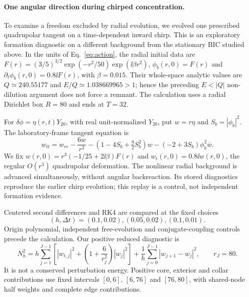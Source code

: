 \paragraph{One angular direction during chirped concentration.}
To examine a freedom excluded by radial evolution, we evolved one prescribed
quadrupolar tangent on a time-dependent inward chirp. This is an exploratory
formation diagnostic on a different background from the stationary BIC
studied above. In the units of Eq.~\eqref{eq:action}, the radial initial data are
$F(r)=(3/5)^{3/2}\exp(-r^2/50)\exp(\ii\beta r^2)$,
$\phi_b(r,0)=F(r)$ and $\partial_t\phi_b(r,0)=0.8\ii F(r)$,
with $\beta=0.015$. Their whole-space analytic values are
$Q\simeq240.55177$ and $E/Q\simeq1.038669965>1$; hence the preceding
$E<|Q|$ non-dilution argument does not force a remnant. The calculation
uses a radial Dirichlet box $R=80$ and ends at $T=32$.

For $\delta\phi=\eta(r,t)Y_{20}$, with real unit-normalized $Y_{20}$,
put $w=r\eta$ and $S_b=|\phi_b|^2$. The laboratory-frame tangent equation is
\begin{equation}
 w_{tt}=w_{rr}-\frac{6w}{r^2}
 -(1-4S_b+\tfrac92 S_b^2)w
 -(-2+3S_b)\phi_b^2\overline w .
 \label{eq:angular-chirp-tangent}
\end{equation}
We fix $w(r,0)=r^3(-1/25+2\ii\beta)F(r)$ and
$w_t(r,0)=0.8\ii w(r,0)$, the regular $O(r^3)$ quadrupolar deformation.
The nonlinear radial background is advanced simultaneously, without angular
backreaction. Its stored diagnostics reproduce the earlier chirp evolution;
this replay is a control, not independent formation evidence.

Centered second differences and RK4 are compared at the fixed choices
\[
(h,\Delta t)=(0.1,0.02),(0.05,0.02),(0.1,0.01).
\]
Origin polynomial, independent free-evolution and conjugate-coupling controls
precede the calculation. Our positive reduced diagnostic is
\begin{equation}
 N_h^2=h\sum_{j=1}^{J-1}
 \left[|w_{t,j}|^2+\left(1+\frac6{r_j^2}\right)|w_j|^2\right]
 +\frac1h\sum_{j=0}^{J-1}|w_{j+1}-w_j|^2,
 \qquad r_J=80 .
 \label{eq:angular-chirp-norm}
\end{equation}
It is not a conserved perturbation energy. Positive core, exterior and
collar contributions use fixed intervals $[0,6]$, $[6,76]$ and $[76,80]$,
with shared-node half weights and complete edge contributions.

